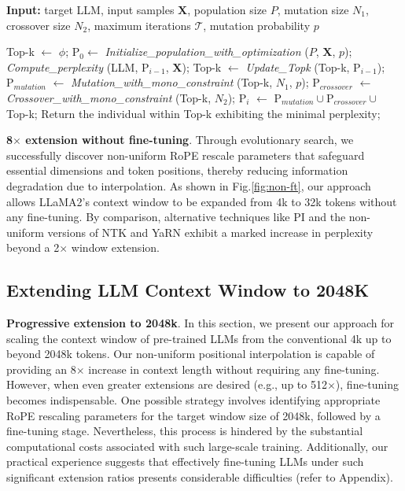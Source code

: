 \begin{algorithm}[t]
	\small
	\caption{The search algorithm}
	\textbf{Input:} target LLM, input samples $\mathbf{X}$, population size $P$, mutation size $N_1$, crossover size $N_2$, maximum iterations $\mathcal{T}$, mutation probability $p$\\

	\begin{algorithmic}[1]
		\label{alg:search}
		\STATE Top-k $\leftarrow$ $\phi$;	
		\STATE $\text{P}_0 \leftarrow$ \textit{Initialize\_population\_with\_optimization} ($P$, $\mathbf{X}$, $p$); 
		\STATE \textit{Compute\_perplexity} (LLM, $\text{P}_{i-1}$, $\mathbf{X}$);
		\STATE Top-k $\leftarrow$ \textit{Update\_Topk} (Top-k, $\text{P}_{i-1}$);
		\STATE $\text{P}_{mutation}$ $\leftarrow$ \textit{Mutation\_with\_mono\_constraint} (Top-k, $N_1$, $p$); 
		\STATE $\text{P}_{crossover}$ $\leftarrow$ \textit{Crossover\_with\_mono\_constraint} (Top-k, $N_2$);
		\STATE $\text{P}_i$ $\leftarrow$ $\text{P}_{mutation} \cup \text{P}_{crossover} \cup$ Top-k;
		\ENDFOR
		\STATE Return the individual within Top-k exhibiting the minimal perplexity;
	\end{algorithmic}
\end{algorithm}

\textbf{8$\times$ extension without fine-tuning}. Through evolutionary search, we successfully discover non-uniform RoPE rescale parameters that safeguard essential dimensions and token positions, thereby reducing information degradation due to interpolation. As shown in Fig.\ref{fig:non-ft}, our approach allows LLaMA2’s context window to be expanded from 4k to 32k tokens without any fine-tuning. By comparison, alternative techniques like PI and the non-uniform versions of NTK and YaRN exhibit a marked increase in perplexity beyond a 2$\times$ window extension.

\subsection{Extending LLM Context Window to 2048K}
\label{sec:extendto2048k}

\textbf{Progressive extension to 2048k}. In this section, we present our approach for scaling the context window of pre-trained LLMs from the conventional 4k up to beyond 2048k tokens. Our non-uniform positional interpolation is capable of providing an 8$\times$ increase in context length without requiring any fine-tuning. However, when even greater extensions are desired (e.g., up to 512$\times$), fine-tuning becomes indispensable. One possible strategy involves identifying appropriate RoPE rescaling parameters for the target window size of 2048k, followed by a fine-tuning stage. Nevertheless, this process is hindered by the substantial computational costs associated with such large-scale training. Additionally, our practical experience suggests that effectively fine-tuning LLMs under such significant extension ratios presents considerable difficulties (refer to Appendix).

